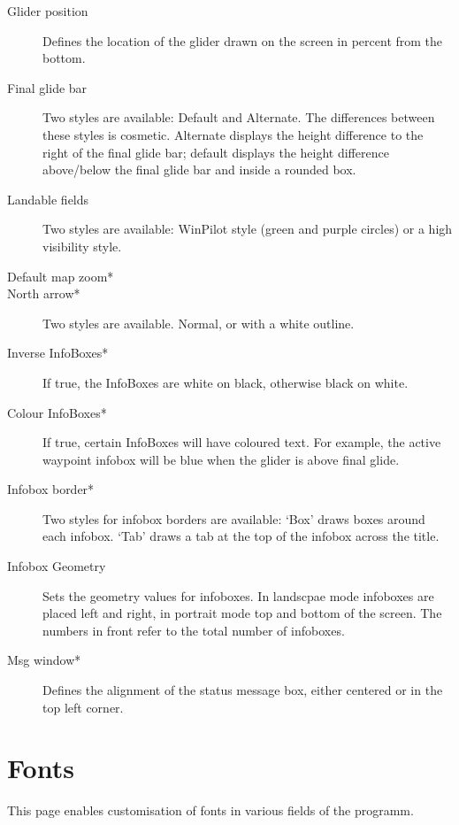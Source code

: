 \documentclass[a4paper,12pt]{refrep}
\begin{document}
\begin{description}
\item[Glider position]  Defines the location of the glider drawn on the screen
in percent from the bottom.
\item[Final glide bar] Two styles are available: Default and Alternate.  The differences between these styles is cosmetic.  Alternate displays the height difference to the right of the final glide bar; default displays the height difference above/below the final glide bar and inside a rounded box.
\item[Landable fields] Two styles are available: WinPilot style (green and
  purple circles) or a high visibility style.
\item[Default map zoom*]
\item[North arrow*]  Two styles are available.  Normal, or with a white
 outline.
\item[Inverse InfoBoxes*]  If true, the InfoBoxes are white on black, otherwise black on white.
\item[Colour InfoBoxes*]  If true, certain InfoBoxes will have coloured text.  For example, the active waypoint infobox will be blue when the glider is above final glide.
\item[Infobox border*]  Two styles for infobox borders are available:
`Box' draws boxes around each infobox.  `Tab' draws a tab at the top
of the infobox across the title.
\item[Infobox Geometry] Sets the geometry values for infoboxes. In landscpae mode infoboxes are placed left and right, in portrait mode top and bottom of the screen. The numbers in front refer to the total number of infoboxes.
\item[Msg window*]  Defines the alignment of the status message box, either centered or in the top left corner.
\end{description}


\clearpage
\section{Fonts}

This page enables customisation of fonts in various fields of the programm.
\end{document}
